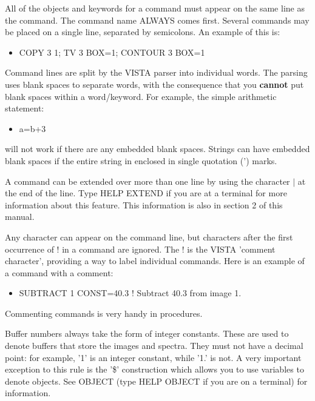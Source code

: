 All of the objects and keywords for a command must appear on the same line
as the command.  The command name ALWAYS comes first.  Several commands may
be placed on a single line, separated by semicolons.  An example of this
is:
\begin{itemize}
   \item{COPY 3 1; TV 3 BOX=1; CONTOUR 3 BOX=1}
\end{itemize}

Command lines are split by the VISTA parser into individual words.  The
parsing uses blank spaces to separate words, with the consequence that you
\textbf{cannot} put blank spaces within a word/keyword. For example, the
simple arithmetic statement:
\begin{itemize}
   \item{a=b+3}
\end{itemize}
will not work if there are any embedded blank spaces. Strings can have
embedded blank spaces if the entire string in enclosed in single quotation
(') marks.

A command can be extended over more than one line by using the character
$|$ at the end of the line.  Type HELP EXTEND if you are at a terminal for
more information about this feature.  This information is also in section 2
of this manual.

Any character can appear on the command line, but characters after the
first occurrence of ! in a command are ignored.  The ! is the VISTA
'comment character', providing a way to label individual commands.  Here is
an example of a command with a comment:
\begin{itemize}
   \item{SUBTRACT 1 CONST=40.3  ! Subtract 40.3 from image 1.}
\end{itemize}
Commenting commands is very handy in procedures. 

Buffer numbers always take the form of integer constants.  These are used
to denote buffers that store the images and spectra.  They must not have a
decimal point: for example, '1' is an integer constant, while '1.' is not.
A very important exception to this rule is the '\$' construction which
allows you to use variables to denote objects.  See OBJECT (type HELP
OBJECT if you are on a terminal) for information.

